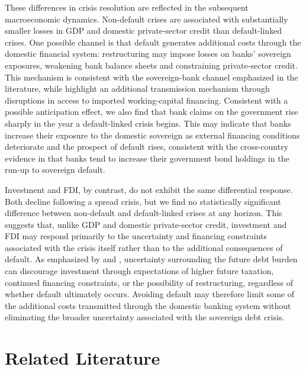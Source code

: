 \documentclass[12pt]{article}
\begin{document}
These differences in crisis resolution are reflected in the subsequent
macroeconomic dynamics. Non-default crises are associated with
substantially smaller losses in GDP and domestic private-sector credit
than default-linked crises. One possible channel is that default
generates additional costs through the domestic financial system:
restructuring may impose losses on banks' sovereign exposures,
weakening bank balance sheets and constraining private-sector credit.
This mechanism is consistent with the sovereign-bank channel
emphasized in the literature, while \citet{mendozayue2012general}
highlight an additional transmission mechanism through disruptions in
access to imported working-capital financing. Consistent with a
possible anticipation effect, we also find that bank claims on the
government rise sharply in the year a default-linked crisis begins.
This may indicate that banks increase their exposure to the domestic
sovereign as external financing conditions deteriorate and the
prospect of default rises, consistent with the cross-country evidence
in \citet{gennaioli2018banks} that banks tend to increase their
government bond holdings in the run-up to sovereign default.

Investment and FDI, by contrast, do not exhibit the same differential
response. Both decline following a spread crisis, but we find no
statistically significant difference between non-default and
default-linked crises at any horizon. This suggests that, unlike GDP
and domestic private-sector credit, investment and FDI may respond
primarily to the uncertainty and financing constraints associated with
the crisis itself rather than to the additional consequences of
default. As emphasized by \citet{krugman1988financing} and
\citet{sachs1989debt}, uncertainty surrounding the future debt burden
can discourage investment through expectations of higher future
taxation, continued financing constraints, or the possibility of
restructuring, regardless of whether default ultimately occurs.
Avoiding default may therefore limit some of the additional costs
transmitted through the domestic banking system without eliminating
the broader uncertainty associated with the sovereign debt crisis.

\section{Related Literature}
\end{document}
